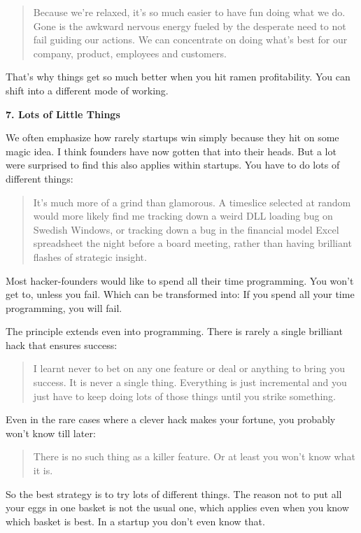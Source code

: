 \begin{quote}
Because we're relaxed, it's so much easier to have fun doing what we do.
Gone is the awkward nervous energy fueled by the desperate need to not
fail guiding our actions. We can concentrate on doing what's best for
our company, product, employees and customers.
\end{quote}

That's why things get so much better when you hit ramen profitability.
You can shift into a different mode of working.

\textbf{7. Lots of Little Things}

We often emphasize how rarely startups win simply because they hit on
some magic idea. I think founders have now gotten that into their heads.
But a lot were surprised to find this also applies within startups. You
have to do lots of different things:

\begin{quote}
It's much more of a grind than glamorous. A timeslice selected at random
would more likely find me tracking down a weird DLL loading bug on
Swedish Windows, or tracking down a bug in the financial model Excel
spreadsheet the night before a board meeting, rather than having
brilliant flashes of strategic insight.
\end{quote}

Most hacker-founders would like to spend all their time programming. You
won't get to, unless you fail. Which can be transformed into: If you
spend all your time programming, you will fail.

The principle extends even into programming. There is rarely a single
brilliant hack that ensures success:

\begin{quote}
I learnt never to bet on any one feature or deal or anything to bring
you success. It is never a single thing. Everything is just incremental
and you just have to keep doing lots of those things until you strike
something.
\end{quote}

Even in the rare cases where a clever hack makes your fortune, you
probably won't know till later:

\begin{quote}
There is no such thing as a killer feature. Or at least you won't know
what it is.
\end{quote}

So the best strategy is to try lots of different things. The reason not
to put all your eggs in one basket is not the usual one, which applies
even when you know which basket is best. In a startup you don't even
know that.

